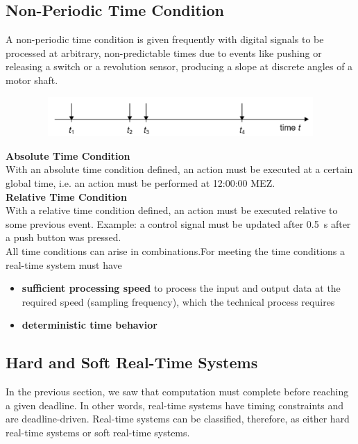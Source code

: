 \subsection{Non-Periodic Time Condition}

A non-periodic time condition is given frequently with digital signals to be processed at arbitrary, non-predictable times due to events like pushing or releasing a switch or a revolution sensor, producing a slope at discrete angles of a motor shaft.\\

	\begin{figure}[h]
    \centering
    \includegraphics[width=12cm, height=1.5cm]{Images/image67.png}
    \label{fig:Fig 13}
    \end{figure}

\textbf{Absolute Time Condition }\\
With an absolute time condition defined, an action must be executed at a certain global time, i.e. an action must be performed at 12:00:00 MEZ.\\

\textbf{Relative Time Condition }\\
With a relative time condition defined, an action must be executed relative to some previous event. Example: a control signal must be updated after 0.5~s after a push button was pressed.\\

All time conditions can arise in combinations.For meeting the time conditions a real-time system must have

\begin{itemize}
	\item  \textbf{sufficient processing speed} to process the input and output data at the required speed (sampling frequency), which the technical process requires
	\item  \textbf{deterministic time behavior}
\end{itemize}

\subsection{Hard and Soft Real-Time Systems}

In the previous section, we saw that computation must complete before reaching a given deadline. In other words, real-time systems have timing constraints and are deadline-driven. Real-time systems can be classified, therefore, as either hard real-time systems or soft real-time systems.\\

